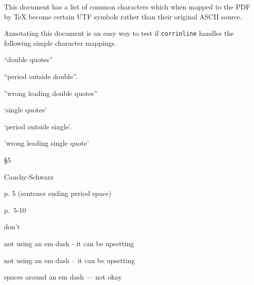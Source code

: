 \documentclass{amsart}
\begin{document}
This document has a list of common characters which when mapped to the PDF by \TeX{} become certain
UTF symbols rather than their original ASCII source.

Annotating this document is an easy way to test if {\tt corrinline} handles the following simple character mappings.

``double quotes''

``period outside double''.

''wrong leading double quotes''

`single quotes'

`period outside single'.

'wrong leading single quote'

\S 5

Cauchy-Schwarz 

p. 5 (sentence ending period space)

p.~5-10 

don't

not using an em dash - it can be upsetting

not using an em dash -- it can be upsetting

spaces around an em dash --- not okay
\end{document}
